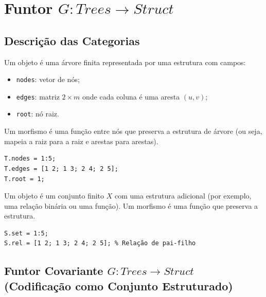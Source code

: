 \section{Funtor \texorpdfstring{$G: Trees \to Struct$}{G: Trees -> Struct}}
\label{sec:functor-trees-struct}

\subsection{Descrição das Categorias}

\begin{definition}
Um objeto é uma árvore finita representada por uma estrutura com campos:
\begin{itemize}
    \item \texttt{nodes}: vetor de nós;
    \item \texttt{edges}: matriz $2 \times m$ onde cada coluna é uma aresta $(u, v)$;
    \item \texttt{root}: nó raiz.
\end{itemize}
Um morfismo é uma função entre nós que preserva a estrutura de árvore (ou seja, mapeia a raiz para a raiz e arestas para arestas).
\end{definition}

\begin{lstlisting}[style=matlab, caption={Objeto e morfismo em $\mathbf{Trees}$}]
T.nodes = 1:5;
T.edges = [1 2; 1 3; 2 4; 2 5];
T.root = 1;
\end{lstlisting}

\begin{definition}
Um objeto é um conjunto finito $X$ com uma estrutura adicional (por exemplo, uma relação binária ou uma função). Um morfismo é uma função que preserva a estrutura.
\end{definition}

\begin{lstlisting}[style=matlab, caption={Objeto em $\mathbf{Struct}$}]
S.set = 1:5;
S.rel = [1 2; 1 3; 2 4; 2 5]; % Relação de pai-filho
\end{lstlisting}

\subsection{Funtor Covariante \texorpdfstring{$G: Trees \to Struct$}{G: Trees -> Struct} (Codificação como Conjunto Estruturado)}

